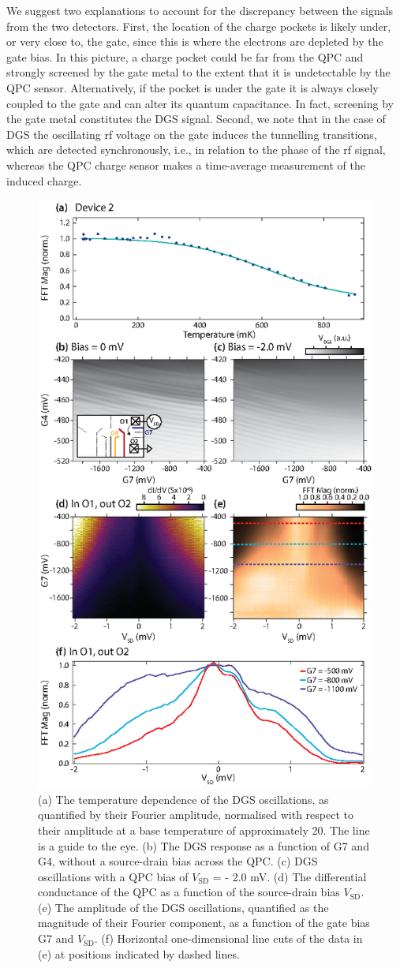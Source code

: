 We suggest two explanations to account for the discrepancy between the signals from the two detectors. First, the location of the charge pockets is likely under, or very close to, the gate, since this is where the electrons are depleted by the gate bias. In this picture, a charge pocket could be far from the QPC and strongly screened by the gate metal to the extent that it is undetectable by the QPC sensor. Alternatively, if the pocket is under the gate it is always closely coupled to the gate and can alter its quantum capacitance. In fact, screening by the gate metal constitutes the DGS signal. Second, we note that in the case of DGS the oscillating rf voltage on the gate induces the tunnelling transitions, which are detected synchronously, i.e., in relation to the phase of the rf signal, whereas the QPC charge sensor makes a time-average measurement of the induced charge.

\begin{figure}
  \includegraphics[width=0.65\linewidth]{figure5}
  \caption[The effect of bias and heating on the visibility of the anomalous sensing signal]{\label{fig:pock_fig5} (a) The temperature dependence of the DGS oscillations, as quantified by their Fourier amplitude, normalised with respect to their amplitude at a base temperature of approximately \SI{20}{\mk}. The line is a guide to the eye. (b) The DGS response as a function of G7 and G4, without a source-drain bias across the QPC. (c) DGS oscillations with a QPC bias of $V_{\textrm{SD}}$ = - 2.0 mV. (d) The differential conductance of the QPC as a function of the source-drain bias $V_{\textrm{SD}}$. (e) The amplitude of the DGS oscillations, quantified as the magnitude of their Fourier component, as a function of the gate bias G7 and $V_{\textrm{SD}}$. (f) Horizontal one-dimensional line cuts of the data in (e) at positions indicated by dashed lines.}
\end{figure}

